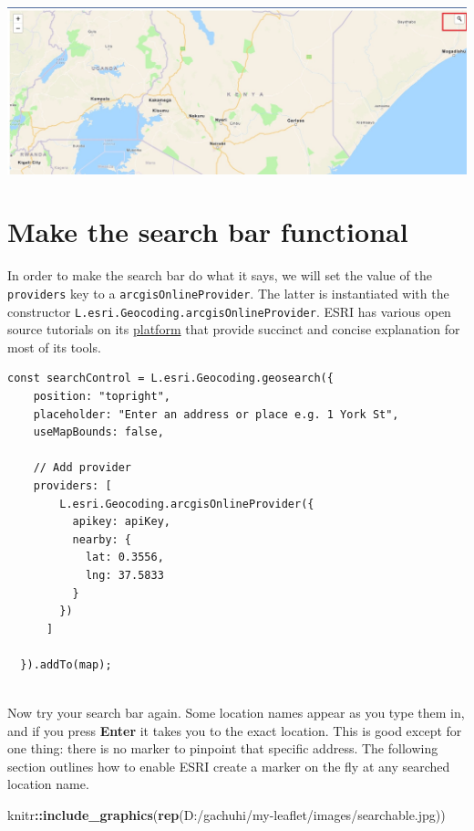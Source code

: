 \documentclass[
]{book}
\newenvironment{Shaded}{\begin{snugshade}}{\end{snugshade}}
\newcommand{\FunctionTok}[1]{\textcolor[rgb]{0.13,0.29,0.53}{\textbf{#1}}}
\newcommand{\NormalTok}[1]{#1}
\newcommand{\SpecialCharTok}[1]{\textcolor[rgb]{0.81,0.36,0.00}{\textbf{#1}}}
\newcommand{\StringTok}[1]{\textcolor[rgb]{0.31,0.60,0.02}{#1}}
\begin{document}
\includegraphics{../images/search_bar.jpg}

\hypertarget{make-the-search-bar-functional}{%
\section{Make the search bar functional}\label{make-the-search-bar-functional}}

In order to make the search bar do what it says, we will set the value of the \texttt{providers} key to a \texttt{arcgisOnlineProvider}. The latter is instantiated with the constructor \texttt{L.esri.Geocoding.arcgisOnlineProvider}. ESRI has various open source tutorials on its \href{https://developers.arcgis.com/esri-leaflet/geocode-and-search/search-for-an-address/?utm_source=pocket_saves}{platform} that provide succinct and concise explanation for most of its tools.

\begin{verbatim}
const searchControl = L.esri.Geocoding.geosearch({
    position: "topright",
    placeholder: "Enter an address or place e.g. 1 York St",
    useMapBounds: false,

    // Add provider
    providers: [
        L.esri.Geocoding.arcgisOnlineProvider({
          apikey: apiKey,
          nearby: {
            lat: 0.3556,
            lng: 37.5833
          }
        })
      ]

  }).addTo(map);
  
\end{verbatim}

Now try your search bar again. Some location names appear as you type them in, and if you press \textbf{Enter} it takes you to the exact location. This is good except for one thing: there is no marker to pinpoint that specific address. The following section outlines how to enable ESRI create a marker on the fly at any searched location name.

\begin{Shaded}
\begin{Highlighting}[]
\NormalTok{knitr}\SpecialCharTok{::}\FunctionTok{include\_graphics}\NormalTok{(}\FunctionTok{rep}\NormalTok{(}\StringTok{\textquotesingle{}D:/gachuhi/my{-}leaflet/images/searchable.jpg\textquotesingle{}}\NormalTok{))}
\end{Highlighting}
\end{Shaded}
\end{document}
